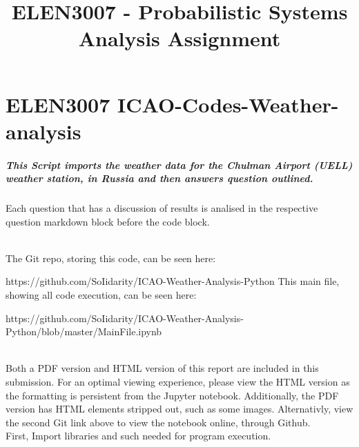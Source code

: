 \documentclass[11pt]{article}
\title{ELEN3007 - Probabilistic Systems Analysis Assignment}
\begin{document}
    
    
    \maketitle
    
    

    
    \section{ELEN3007
ICAO-Codes-Weather-analysis}\label{elen3007-icao-codes-weather-analysis}

\subparagraph{This Script imports the weather data for the Chulman
Airport (UELL) weather station, in Russia and then answers question
outlined.}\label{this-script-imports-the-weather-data-for-the-chulman-airport-uell-weather-station-in-russia-and-then-answers-question-outlined.}

Each question that has a discussion of results is analised in the
respective question markdown block before the code block.

\\
The Git repo, storing this code, can be seen here:

https://github.com/SoIidarity/ICAO-Weather-Analysis-Python This main
file, showing all code execution, can be seen here:

https://github.com/SoIidarity/ICAO-Weather-Analysis-Python/blob/master/MainFile.ipynb

\\
Both a PDF version and HTML version of this report are included in this
submission. For an optimal viewing experience, please view the HTML
version as the formatting is persistent from the Jupyter notebook.
Additionally, the PDF version has HTML elements stripped out, such as
some images. Alternativly, view the second Git link above to view the
notebook online, through Github.
\\

    First, Import libraries and such needed for program execution.
\end{document}
